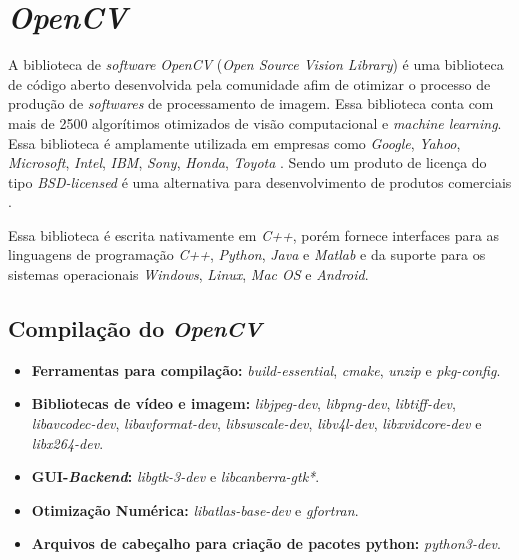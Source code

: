 \section{\textit{OpenCV}}
A biblioteca de \textit{software} \textit{OpenCV} (\textit{Open Source Vision Library}) é uma biblioteca de código aberto desenvolvida pela comunidade afim de otimizar o processo de produção de \textit{softwares} de processamento de imagem. Essa biblioteca conta com mais de 2500 algorítimos otimizados de visão computacional e \textit{machine learning}.
Essa biblioteca é amplamente utilizada em empresas como \textit{Google}, \textit{Yahoo}, \textit{Microsoft}, \textit{Intel}, \textit{IBM}, \textit{Sony}, \textit{Honda}, \textit{Toyota} \cite{aboutopencv2019}. Sendo um produto de licença do tipo \textit{BSD-licensed} é uma alternativa para desenvolvimento de produtos comerciais \cite{opensource2019}.
    
Essa biblioteca é escrita nativamente em \textit{C++}, porém fornece interfaces para as linguagens de programação \textit{C++}, \textit{Python}, \textit{Java} e \textit{Matlab} e da suporte para os sistemas operacionais \textit{Windows}, \textit{Linux}, \textit{Mac OS} e \textit{Android}.  

\subsection{Compilação do \textit{OpenCV}}

\begin{itemize}
    \item \textbf{Ferramentas para compilação:} \textit{build-essential}, \textit{cmake}, \textit{unzip} e \textit{pkg-config}.
    \item \textbf{Bibliotecas de vídeo e imagem:} \textit{libjpeg-dev}, \textit{libpng-dev}, \textit{libtiff-dev}, \textit{libavcodec-dev}, \textit{libavformat-dev},  \textit{libswscale-dev}, \textit{libv4l-dev}, \textit{libxvidcore-dev} e \textit{libx264-dev}.
    \item \textbf{GUI-\textit{Backend}:} \textit{libgtk-3-dev} e \textit{libcanberra-gtk*}.
    \item \textbf{Otimização Numérica:} \textit{libatlas-base-dev} e \textit{gfortran}.
    \item \textbf{Arquivos de cabeçalho para criação de pacotes python:} \textit{python3-dev}.
\end{itemize}

\cite{rosebrock2018}


